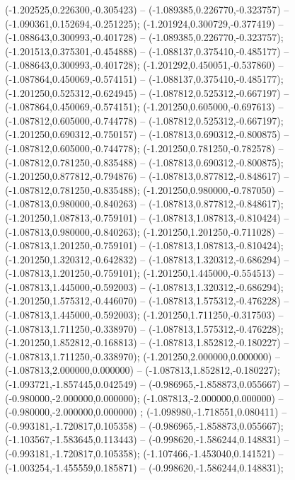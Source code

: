  (-1.202525,0.226300,-0.305423) -- (-1.089385,0.226770,-0.323757) -- (-1.090361,0.152694,-0.251225);
 (-1.201924,0.300729,-0.377419) -- (-1.088643,0.300993,-0.401728) -- (-1.089385,0.226770,-0.323757);
 (-1.201513,0.375301,-0.454888) -- (-1.088137,0.375410,-0.485177) -- (-1.088643,0.300993,-0.401728);
 (-1.201292,0.450051,-0.537860) -- (-1.087864,0.450069,-0.574151) -- (-1.088137,0.375410,-0.485177);
 (-1.201250,0.525312,-0.624945) -- (-1.087812,0.525312,-0.667197) -- (-1.087864,0.450069,-0.574151);
 (-1.201250,0.605000,-0.697613) -- (-1.087812,0.605000,-0.744778) -- (-1.087812,0.525312,-0.667197);
 (-1.201250,0.690312,-0.750157) -- (-1.087813,0.690312,-0.800875) -- (-1.087812,0.605000,-0.744778);
 (-1.201250,0.781250,-0.782578) -- (-1.087812,0.781250,-0.835488) -- (-1.087813,0.690312,-0.800875);
 (-1.201250,0.877812,-0.794876) -- (-1.087813,0.877812,-0.848617) -- (-1.087812,0.781250,-0.835488);
 (-1.201250,0.980000,-0.787050) -- (-1.087813,0.980000,-0.840263) -- (-1.087813,0.877812,-0.848617);
 (-1.201250,1.087813,-0.759101) -- (-1.087813,1.087813,-0.810424) -- (-1.087813,0.980000,-0.840263);
 (-1.201250,1.201250,-0.711028) -- (-1.087813,1.201250,-0.759101) -- (-1.087813,1.087813,-0.810424);
 (-1.201250,1.320312,-0.642832) -- (-1.087813,1.320312,-0.686294) -- (-1.087813,1.201250,-0.759101);
 (-1.201250,1.445000,-0.554513) -- (-1.087813,1.445000,-0.592003) -- (-1.087813,1.320312,-0.686294);
 (-1.201250,1.575312,-0.446070) -- (-1.087813,1.575312,-0.476228) -- (-1.087813,1.445000,-0.592003);
 (-1.201250,1.711250,-0.317503) -- (-1.087813,1.711250,-0.338970) -- (-1.087813,1.575312,-0.476228);
 (-1.201250,1.852812,-0.168813) -- (-1.087813,1.852812,-0.180227) -- (-1.087813,1.711250,-0.338970);
 (-1.201250,2.000000,0.000000) -- (-1.087813,2.000000,0.000000) -- (-1.087813,1.852812,-0.180227);
 (-1.093721,-1.857445,0.042549) -- (-0.986965,-1.858873,0.055667) -- (-0.980000,-2.000000,0.000000);
 (-1.087813,-2.000000,0.000000) -- (-0.980000,-2.000000,0.000000) ;
 (-1.098980,-1.718551,0.080411) -- (-0.993181,-1.720817,0.105358) -- (-0.986965,-1.858873,0.055667);
 (-1.103567,-1.583645,0.113443) -- (-0.998620,-1.586244,0.148831) -- (-0.993181,-1.720817,0.105358);
 (-1.107466,-1.453040,0.141521) -- (-1.003254,-1.455559,0.185871) -- (-0.998620,-1.586244,0.148831);
